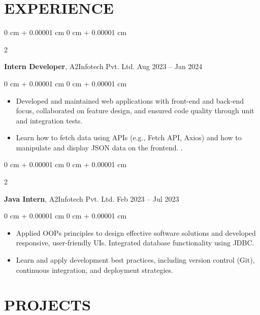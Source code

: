 \documentclass[10pt, letterpaper]{article}
\newenvironment{highlights}{
    \begin{itemize}[
        topsep=0.10 cm,
        parsep=0.10 cm,
        partopsep=0pt,
        itemsep=0pt,
        leftmargin=0 cm + 10pt
    ]
}{
    \end{itemize}
}
\newenvironment{onecolentry}{
    \begin{adjustwidth}{
        0 cm + 0.00001 cm
    }{
        0 cm + 0.00001 cm
    }
}{
    \end{adjustwidth}
}
\newenvironment{twocolentry}[2][]{
    \onecolentry
    \def\secondColumn{#2}
    \setcolumnwidth{\fill, 4.5 cm}
    \begin{paracol}{2}
}{
    \switchcolumn \raggedleft \secondColumn
    \end{paracol}
    \endonecolentry
}
\begin{document}
    \section{\textcolor{highlightColor}{EXPERIENCE}}

        \begin{twocolentry}{
            Aug 2023 – Jan 2024
        }
            \textbf{Intern Developer}, A2Infotech Pvt. Ltd. \end{twocolentry}

        \vspace{0.10 cm}
        \begin{onecolentry}
            \begin{highlights}
                \item Developed and maintained web applications with front-end and back-end focus, collaborated on feature design, and ensured code quality through unit and integration tests.
                \item Learn how to fetch data using APIs (e.g., Fetch API, Axios) and how to manipulate and display JSON data on the frontend. .
            \end{highlights}
        \end{onecolentry}

        \begin{twocolentry}{
            Feb 2023 – Jul 2023
        }
            \textbf{Java Intern}, A2Infotech Pvt. Ltd. \end{twocolentry}

        \vspace{0.10 cm}
        \begin{onecolentry}
            \begin{highlights}
                \item Applied OOPs principles to design effective software solutions and developed responsive, user-friendly UIs. Integrated database functionality using JDBC.
                \item Learn and apply development best practices, including version control (Git), continuous integration, and deployment strategies.
            \end{highlights}
        \end{onecolentry}

        

    \section{\textcolor{highlightColor}{PROJECTS}}
\end{document}
